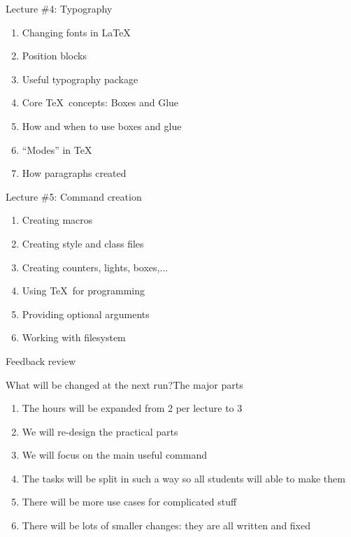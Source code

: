 \documentclass[14pt, aspectratio=169]{beamer}
\begin{document}
\begin{frame}{Lecture \#4: Typography}\relax

\begin{enumerate}
    \item Changing fonts in \LaTeX
    \item Position blocks
    \item Useful typography package 
    \item Core \TeX\ concepts: Boxes and Glue
    \item How and when to use boxes and glue 
    \item ``Modes'' in \TeX
    \item How paragraphs created
\end{enumerate}
     
\end{frame}

\begin{frame}{Lecture \#5: Command creation}\relax

\begin{enumerate}
    \item Creating macros
    \item Creating style and class files
    \item Creating counters, lights, boxes,...
    \item Using \TeX\ for programming
    \item Providing optional arguments
    \item Working with filesystem
\end{enumerate}
     
\end{frame}


\begin{frame}

\Huge \centering Feedback review
\end{frame}

\begin{frame}{What will be changed at the next run?}{The major parts}\relax

\begin{enumerate}
    \item The hours will be expanded from 2 per lecture to 3
    \item We will re-design the practical parts
    \item We will focus on the main useful command 
    \item The tasks will be split in such a way so all students will able to make them 
    \item There will be more use cases for complicated stuff
    \item There will be lots of smaller changes: they are all written and fixed
     
\end{enumerate}
\end{frame}
\end{document}
